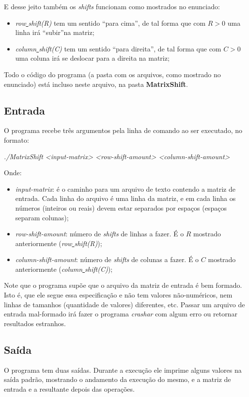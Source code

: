 E desse jeito também os \textit{shifts} funcionam como mostrados no enunciado:
\begin{itemize}
  \item \textit{row\underline{ }shift(R)} tem um sentido \textquotedblleft para cima\textquotedblright,
        de tal forma que com $R>0$ uma linha irá \textquotedblleft subir\textquotedblright  na matriz;
  \item \textit{column\underline{ }shift(C)} tem um sentido \textquotedblleft para direita\textquotedblright,
        de tal forma que com $C>0$ uma coluna irá se deslocar para a direita na matriz;
\end{itemize}

Todo o código do programa (a pasta com os arquivos, como mostrado no enunciado) está incluso neste arquivo,
na pasta \textbf{MatrixShift}.

\subsection{Entrada}
O programa recebe três argumentos pela linha de comando ao ser executado, no formato:
\begin{center}
\textit{./MatrixShift <input-matrix> <row-shift-amount> <column-shift-amount>}
\end{center}
Onde:
\begin{itemize}
  \item \textit{input-matrix}: é o caminho para um arquivo de texto contendo a matriz de entrada. Cada linha do
        arquivo é uma linha da matriz, e em cada linha os números (inteiros ou reais) devem estar separados
        por espaços (espaços separam colunas);
  \item \textit{row-shift-amount}: número de \textit{shifts} de linhas a fazer. É o $R$ mostrado anteriormente 
        (\textit{row\underline{ }shift(R)});
  \item \textit{column-shift-amount}: número de \textit{shifts} de colunas a fazer. É o $C$ mostrado anteriormente 
        (\textit{column\underline{ }shift(C)});
\end{itemize}

Note que o programa supõe que o arquivo da matriz de entrada é bem formado. Isto é, que ele segue essa especificação
e não tem valores não-numéricos, nem linhas de tamanhos (quantidade de valores) diferentes, etc. Passar um arquivo
de entrada mal-formado irá fazer o programa \textit{crashar} com algum erro ou retornar resultados estranhos.

\subsection{Saída}
O programa tem duas saídas. Durante a execução ele imprime alguns valores na saída padrão, mostrando o andamento da
execução do mesmo, e a matriz de entrada e a resultante depois das operações.

